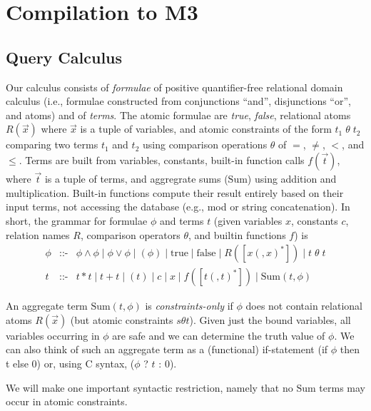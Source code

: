 

\section{Compilation to M3}
\label{sec:compiler}


\subsection{Query Calculus}


\def\safe{\mbox{safe}}
\def\AggSum{\mbox{Sum}}

Our calculus consists of
{\em formulae} of positive quantifier-free relational domain calculus
(i.e., formulae constructed from conjunctions ``and'',
disjunctions ``or'', and atoms) and of {\em terms}.
%
The atomic formulae are {\em true}, {\em false}, relational atoms $R(\vec{x})$
where $\vec{x}$ is a tuple of variables,
and atomic constraints of the form $t_1 \;\theta\; t_2$ comparing two terms
$t_1$ and $t_2$ using comparison operations $\theta$ of $=$, $\neq$, $<$,
and $\leq$.
%
Terms are built from variables, constants, built-in function calls
$f(\vec{t})$, where $\vec{t}$ is a tuple of terms,
and aggregrate sums ($\AggSum$) using addition and multiplication.
Built-in functions compute their result entirely based on their input
terms, not accessing the database (e.g., mod or string concatenation).
In short, the grammar for formulae $\phi$ and terms $t$
(given variables $x$, constants $c$, relation names $R$,
comparison operators $\theta$,
and builtin functions $f$) is
\begin{eqnarray*}
  \phi &\mbox{::-}& \phi \land \phi
               \mid \phi \lor \phi \mid (\phi)
               \mid \mbox{true} \mid \mbox{false} \mid R([x(,x)^*])
               \mid t \;\theta\; t
\\
  t &\mbox{::-}& t * t \mid t + t \mid (t) \mid c \mid x \mid f([t(,t)^*]) \mid
                 \AggSum(t, \phi)
\end{eqnarray*}

An aggregate term $\AggSum(t, \phi)$
is {\em constraints-only} if $\phi$ does not
contain relational atoms $R(\vec{x})$ (but atomic constraints $s \theta t$).
Given just the bound variables, all variables
occurring in $\phi$ are safe and we can determine the truth value of
$\phi$. We can also think of such an aggregate term as a (functional)
if-statement (if $\phi$ then t else 0)
or, using C syntax, ($\phi$ ? $t$ : 0).

We will make one important syntactic restriction, namely that
no $\AggSum$ terms may occur in atomic constraints.

